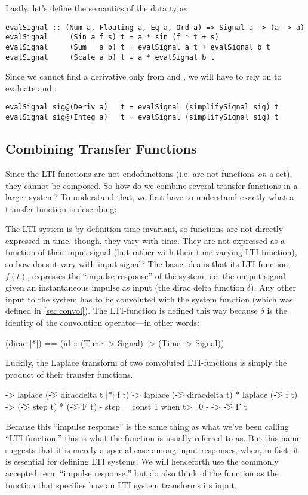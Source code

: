 Lastly, let's define the semantics of the data type:
\begin{verbatim}
evalSignal :: (Num a, Floating a, Eq a, Ord a) => Signal a -> (a -> a)
evalSignal     (Sin a f s) t = a * sin (f * t + s)
evalSignal     (Sum   a b) t = evalSignal a t + evalSignal b t
evalSignal     (Scale a b) t = a * evalSignal b t
\end{verbatim}
Since we cannot find a derivative only from  and , we will have to rely on  to evaluate  and :
\begin{verbatim}
evalSignal sig@(Deriv a)   t = evalSignal (simplifySignal sig) t
evalSignal sig@(Integ a)   t = evalSignal (simplifySignal sig) t
\end{verbatim}



\subsection{Combining Transfer Functions}\label{sec:comb}
Since the LTI-functions are not endofunctions (i.e. are not functions \textit{on} a set), they cannot be composed. So how do we combine several transfer functions in a larger system? To understand that, we first have to understand exactly what a transfer function is describing:

The LTI system is by definition time-invariant, so functions are not directly expressed in time, though, they vary with time. They are not expressed as a function of their input signal (but rather with their time-varying LTI-function), so how does it vary with input signal? The basic idea is that its LTI-function, $f(t)$, expresses the ``impulse response'' of the system, i.e. the output signal given an instantaneous impulse as input (the dirac delta function $\delta$). Any other input to the system has to be convoluted with the system function (which was defined in \ref{sec:convol}). 
The LTI-function is defined this way because $\delta$ is the identity of the convolution operator---in other words:
\begin{codeeq}
(dirac |*|) == (id :: (Time -> Signal) -> (Time -> Signal))
\end{codeeq}
Luckily, the Laplace transform of two convoluted LTI-functions is simply the product of their transfer functions.

\begin{codeeq}
\f -> laplace (\t -> diracdelta t |*| f t)
\f -> laplace (\t -> diracdelta t) * laplace (\t -> f t)
\f -> (\t -> step t) * (\t -> F t)
{- step = const 1 when t>=0 -}
\f -> \t -> F t
\end{codeeq}
Because this ``impulse response'' is the same thing as what we've been calling ``LTI-function,'' this is what the function is usually referred to as. But this name suggests that it is merely a special case among input responses, when, in fact, it is essential for defining LTI systems. We will henceforth use the commonly accepted term ``impulse response,'' but do also think of the function as the function that specifies how an LTI system transforms its input.


